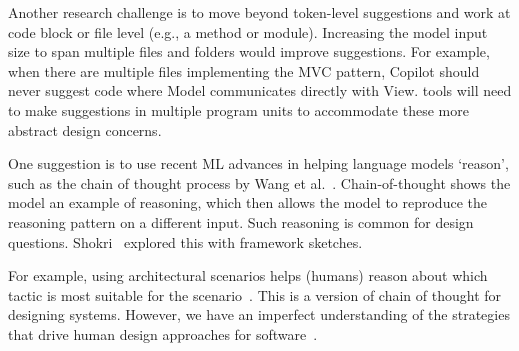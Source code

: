 Another research challenge is to move beyond token-level suggestions and work at code block or file level (e.g., a method or module). 
Increasing the model input size to span multiple files and folders would improve suggestions. For example, when there are multiple files implementing the MVC pattern, Copilot should never suggest code where \textsf{Model} communicates directly with \textsf{View}. 
\AISE{} tools will need to make suggestions in multiple program units to accommodate these more abstract design concerns.

One suggestion is to use recent ML advances in helping language models `reason', such as the chain of thought process by Wang et al.~\cite{chain_of_thought}. 
Chain-of-thought shows the model an example of reasoning, which then allows the model to reproduce the reasoning pattern on a different input.
Such reasoning is common for design questions. 
Shokri~\cite{shokri21} explored this with framework sketches.

For example, using architectural scenarios helps (humans) reason about which tactic is most suitable for the scenario~\cite{kazman98}. This is a version of chain of thought for designing systems. 
However, we have an imperfect understanding of the strategies that drive human design approaches for software~\cite{Arab2022}. 